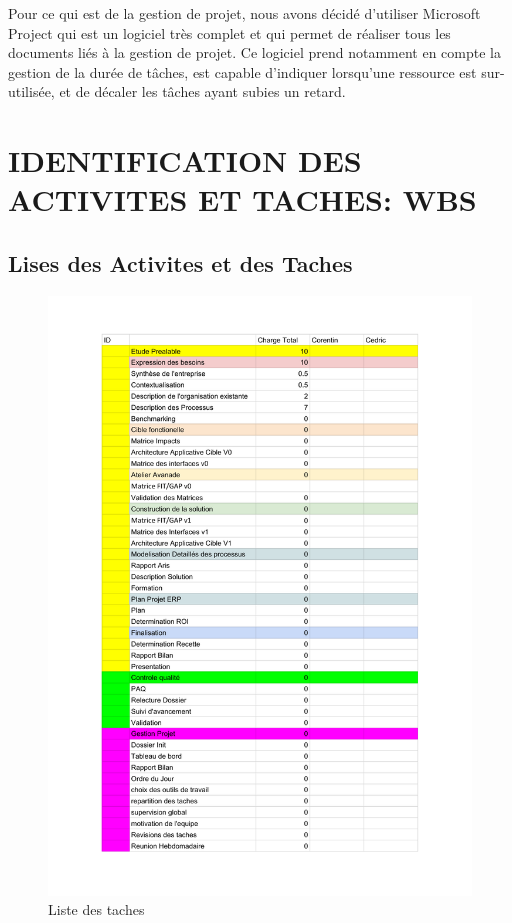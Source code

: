 \documentclass[]{scrartcl}
\begin{document}
Pour ce qui est de la gestion de projet, nous avons décidé d'utiliser Microsoft Project qui est un logiciel très complet et qui permet de réaliser tous les documents liés à la gestion de projet. Ce logiciel prend notamment en compte la gestion de la durée de tâches, est capable d'indiquer lorsqu'une ressource est sur-utilisée, et de décaler les tâches ayant subies un retard. 

\section{IDENTIFICATION DES ACTIVITES ET TACHES: WBS}
\subsection{Lises des Activites et des Taches}
\begin{center}
\begin{figure}[H]
\includegraphics[width=1.15\textwidth]{img/Taches_v0}
\caption{Liste des taches}
\end{figure}
\end{center}
\end{document}

